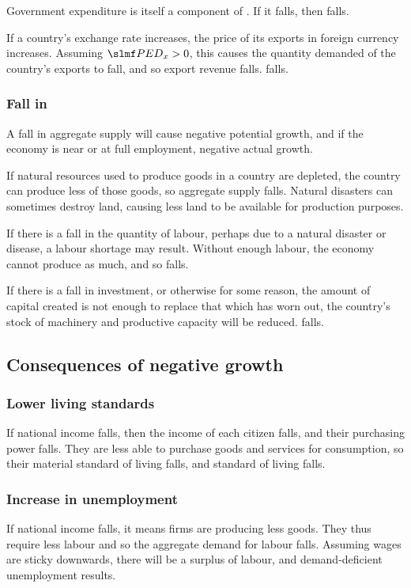 \documentclass[Economics.tex]{subfiles}
\begin{document}
Government expenditure is itself a component of \AD{}. If it falls, then \AD{} falls.

If a country's exchange rate increases, the price of its exports in foreign currency increases. Assuming \(\PEDx{} > 0\), this causes the quantity demanded of the country's exports to fall, and so export revenue falls. \AD{} falls.
\subsubsection{Fall in \AS{}}
A fall in aggregate supply will cause negative potential growth, and if the economy is near or at full employment, negative actual growth.

If natural resources used to produce goods in a country are depleted, the country can produce less of those goods, so aggregate supply falls. Natural disasters can sometimes destroy land, causing less land to be available for production purposes.

If there is a fall in the quantity of labour, perhaps due to a natural disaster or disease, a labour shortage may result. Without enough labour, the economy cannot produce as much, and so \AS{} falls.

If there is a fall in investment, or otherwise for some reason, the amount of capital created is not enough to replace that which has worn out, the country's stock of machinery and productive capacity will be reduced. \AS{} falls.
\subsection{Consequences of negative growth}
\subsubsection{Lower living standards}
If national income falls, then the income of each citizen falls, and their purchasing power falls. They are less able to purchase goods and services for consumption, so their material standard of living falls, and standard of living falls.
\subsubsection{Increase in unemployment}
If national income falls, it means firms are producing less goods. They thus require less labour and so the aggregate demand for labour falls. Assuming wages are sticky downwards, there will be a surplus of labour, and demand-deficient unemployment results.
\end{document}
